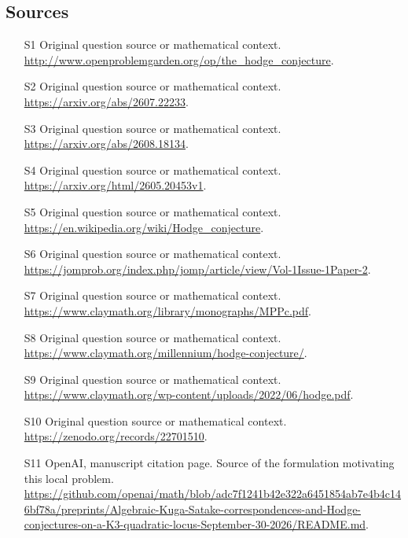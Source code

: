 \documentclass[11pt]{article}
\begin{document}
\subsection{Sources}
\begin{itemize}
\item[S1] Original question source or mathematical context.
\url{http://www.openproblemgarden.org/op/the_hodge_conjecture}.
\item[S2] Original question source or mathematical context.
\url{https://arxiv.org/abs/2607.22233}.
\item[S3] Original question source or mathematical context.
\url{https://arxiv.org/abs/2608.18134}.
\item[S4] Original question source or mathematical context.
\url{https://arxiv.org/html/2605.20453v1}.
\item[S5] Original question source or mathematical context.
\url{https://en.wikipedia.org/wiki/Hodge_conjecture}.
\item[S6] Original question source or mathematical context.
\url{https://jomprob.org/index.php/jomp/article/view/Vol-1Issue-1Paper-2}.
\item[S7] Original question source or mathematical context.
\url{https://www.claymath.org/library/monographs/MPPc.pdf}.
\item[S8] Original question source or mathematical context.
\url{https://www.claymath.org/millennium/hodge-conjecture/}.
\item[S9] Original question source or mathematical context.
\url{https://www.claymath.org/wp-content/uploads/2022/06/hodge.pdf}.
\item[S10] Original question source or mathematical context.
\url{https://zenodo.org/records/22701510}.
\item[S11] OpenAI, manuscript citation page. Source of the formulation motivating this local problem.
\url{https://github.com/openai/math/blob/adc7f1241b42e322a6451854ab7e4b4c146bf78a/preprints/Algebraic-Kuga-Satake-correspondences-and-Hodge-conjectures-on-a-K3-quadratic-locus-September-30-2026/README.md}.
\end{itemize}
\end{document}
